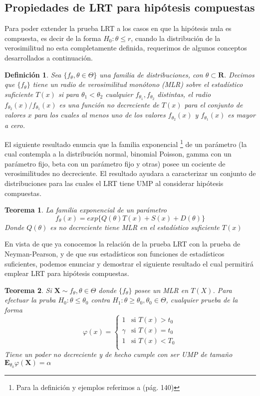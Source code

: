 \documentclass[peerreview]{IEEEtran}
\newtheorem{theorem}{Teorema}
\newtheorem{definition}{Definición}
\begin{document}
\subsection{Propiedades de LRT para hipótesis compuestas}
Para poder extender la prueba LRT a los casos en que la hipótesis nula es compuesta, es decir de la forma $H_0: \theta \leq r$, cuando la distribución de la verosimilitud no esta completamente definida, requerimos de algunos conceptos desarrollados a continuación.
\begin{definition}
Sea $\{ f_\theta, \theta  \in \Theta \}$ una familia de distribuciones, con $\theta \subset \mathbf{R}$. Decimos que $\{f_\theta \}$ tiene un radio de verosimilitud monótono (MLR) sobre el estadístico suficiente $T(x)$ si para $\theta_1 < \theta_2$ cualquier $f_{\theta_1},f_{\theta_2}$ distintas, el radio $f_{\theta_2}(x)/ f_{\theta_1}(x)$ es una función no decreciente de $T(x)$ para el conjunto de valores $x$ para los cuales al menos uno de los valores $f_{\theta_2}(x) $ y $f_{\theta_1}(x)$ es mayor a cero.
\end{definition}
El siguiente resultado enuncia que la familia exponencial \footnote{Para la definición y ejemplos referimos a \cite{Wasserman} (pág. 140)} de un parámetro (la cual contempla a la distribución normal, binomial Poisson, gamma con un parámetro fijo, beta con un parámetro fijo y otras) posee un cociente de verosimilitudes no decreciente. El resultado ayudara a caracterizar un conjunto de distribuciones para las cuales el LRT tiene UMP al considerar hipótesis compuestas.
\begin{theorem}
La familia exponencial de un parámetro 
\[
f_\theta(x) = exp\{ Q(\theta)T(x)+S(x)+D(\theta) \}
\]
Donde $Q(\theta)$ es no decreciente tiene MLR en el estadístico suficiente $T(x)$
\end{theorem}
En vista de que ya conocemos la relación de la  prueba LRT con la prueba de Neyman-Pearson, y de que sus estadísticos son funciones de estadísticos suficientes, podemos enunciar y demostrar el siguiente resultado el cual permitirá emplear LRT para hipótesis compuestas.  
\begin{theorem}
Si $\mathbf{X} \sim f_\theta, \theta \in \Theta$ donde $\{f_\theta\}$ posee un MLR en $T(X)$. Para efectuar la pruba $H_0:\theta \leq \theta_0$ contra $H_1:\theta \geq \theta_0, \theta_0 \in \Theta$, cualquier prueba de la forma 
\begin{equation}
			\varphi(x)= \left\{ \begin{array}{lr}
							1 &	\textrm{si  } T(x) > t_0 \\
							\gamma  & \textrm{si  } T(x) = t_0 \\ 
							1 & \textrm{si  } T(x) < T_0 \\
							\end{array}
					\right.
\end{equation}
Tiene un poder no decreciente y de hecho cumple con ser UMP de tamaño $\mathbf{E}_{\theta_0}\varphi(\mathbf{X})=\alpha$
\end{theorem}
\end{document}
